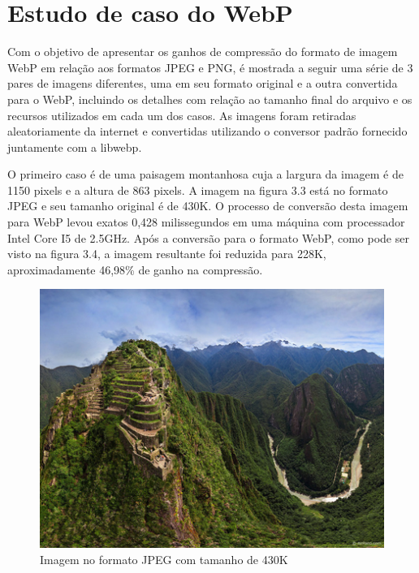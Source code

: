 \documentclass[espaco=simples,appendix=Name]{abnt}
\begin{document}
\section{Estudo de caso do WebP}

Com o objetivo de apresentar os ganhos de compressão do formato de imagem WebP em relação aos formatos JPEG e PNG, é mostrada a seguir uma série de 3 pares de imagens diferentes, uma em seu formato original e a outra convertida para o WebP, incluindo os detalhes com relação ao tamanho final do arquivo e os recursos utilizados em cada um dos casos. As imagens foram retiradas aleatoriamente da internet e convertidas utilizando o conversor padrão fornecido juntamente com a libwebp.

O primeiro caso é de uma paisagem montanhosa cuja a largura da imagem é de 1150 pixels e a altura de 863 pixels. A imagem na figura 3.3 está no formato JPEG e seu tamanho original é de 430K. O processo de conversão desta imagem para WebP levou exatos 0,428 milissegundos em uma máquina com processador Intel Core I5 de 2.5GHz. Após a conversão para o formato WebP, como pode ser visto na figura 3.4, a imagem resultante foi reduzida para 228K, aproximadamente 46,98\% de ganho na compressão.

\begin{figure}[h]
  \centering
    \includegraphics[scale=0.5]{Imagem1JPEG.png}
  \caption{Imagem no formato JPEG com tamanho de 430K}
\end{figure}
\end{document}
